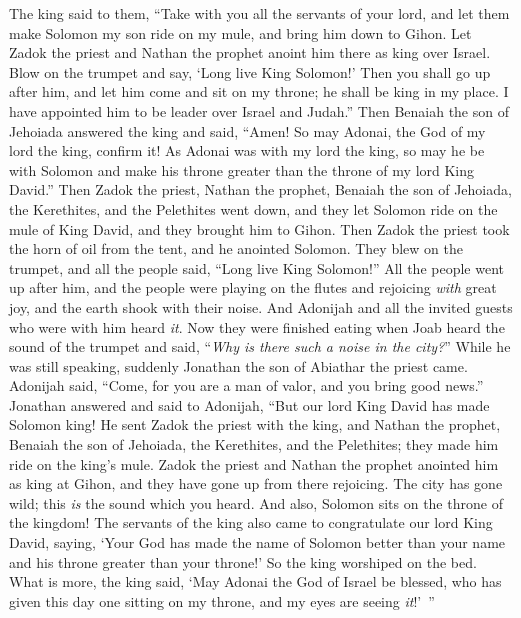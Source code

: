 \begin{biblechapter}
\verse The king said to them, “Take with you all the servants of your lord, and let them make Solomon my son ride on my mule, and bring him down to Gihon.
\verse Let Zadok the priest and Nathan the prophet anoint him there as king over Israel. Blow on the trumpet and say, ‘Long live King Solomon!’
\verse Then you shall go up after him, and let him come and sit on my throne; he shall be king in my place. I have appointed him to be leader over Israel and Judah.”
\verse Then Benaiah the son of Jehoiada answered the king and said, “Amen! So may Adonai, the God of my lord the king, confirm it!
\verse As Adonai was with my lord the king, so may he be with Solomon and make his throne greater than the throne of my lord King David.”
\verse Then Zadok the priest, Nathan the prophet, Benaiah the son of Jehoiada, the Kerethites, and the Pelethites went down, and they let Solomon ride on the mule of King David, and they brought him to Gihon.
\verse Then Zadok the priest took the horn of oil from the tent, and he anointed Solomon. They blew on the trumpet, and all the people said, “Long live King Solomon!”
\verse All the people went up after him, and the people were playing on the flutes and rejoicing \textit{with} great joy, and the earth shook with their noise.
 And Adonijah and all the invited guests who were with him heard \textit{it}. Now they were finished eating when Joab heard the sound of the trumpet and said, “\textit{Why is there such a noise in the city?}”
\verse While he was still speaking, suddenly Jonathan the son of Abiathar the priest came. Adonijah said, “Come, for you are a man of valor, and you bring good news.”
\verse Jonathan answered and said to Adonijah, “But our lord King David has made Solomon king!
\verse He sent Zadok the priest with the king, and Nathan the prophet, Benaiah the son of Jehoiada, the Kerethites, and the Pelethites; they made him ride on the king’s mule.
\verse Zadok the priest and Nathan the prophet anointed him as king at Gihon, and they have gone up from there rejoicing. The city has gone wild; this \textit{is} the sound which you heard.
\verse And also, Solomon sits on the throne of the kingdom!
\verse The servants of the king also came to congratulate our lord King David, saying, ‘Your God has made the name of Solomon better than your name and his throne greater than your throne!’ So the king worshiped on the bed.
\verse What is more, the king said, ‘May Adonai the God of Israel be blessed, who has given this day one sitting on my throne, and my eyes are seeing \textit{it}!’ ”

\end{biblechapter}
